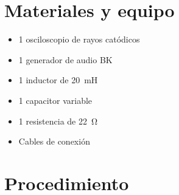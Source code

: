 \documentclass[12pt,letterpaper]{report}
\newcommand{\mat}{Materiales y equipo}
\newcommand{\pro}{Procedimiento}
\begin{document}
\section{\mat}
\begin{itemize}
\item 1 osciloscopio de rayos catódicos
\item 1 generador de audio BK
\item 1 inductor de \SI{20}{\milli\henry}
\item 1 capacitor variable
\item 1 resistencia de \SI{22}{\ohm}
\item Cables de conexión
\end{itemize}
\section{\pro}
\end{document}
